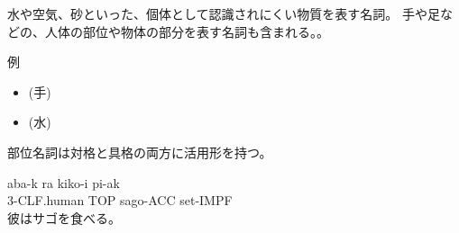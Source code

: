 水や空気、砂といった、個体として認識されにくい物質を表す名詞。
手や足などの、人体の部位や物体の部分を表す名詞も含まれる。。

例
\begin{itemize}
\item {} (手)
\item {} (水)
\end{itemize}


部位名詞は対格と具格の両方に活用形を持つ。

\begin{exe}
    \ex \gll aba-k ra kiko-i pi-ak \\
        3-CLF.human TOP sago-ACC set-IMPF \\
        \glt 彼はサゴを食べる。
\end{exe}
